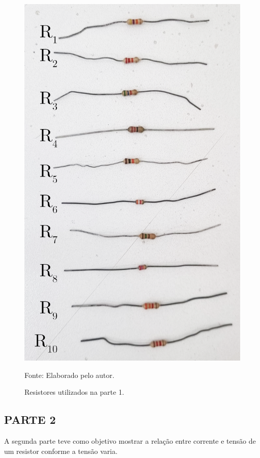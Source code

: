 \documentclass[12pt]{article}
\begin{document}
\begin{figure}[H]
    \centering
    \caption{Resistores utilizados na parte 1.}
    \begin{minipage}{0.45\textwidth}
        \centering
        \includegraphics[width=\textwidth]{external-figures/resistores-pratica1.png}\\
        \raggedright\footnotesize{Fonte: Elaborado pelo autor.}
        \label{fig:pratica1}
    \end{minipage}
\end{figure}

\subsection{PARTE 2}
A segunda parte teve como objetivo mostrar a relação entre corrente e tensão de um resistor conforme a tensão varia.
\end{document}
